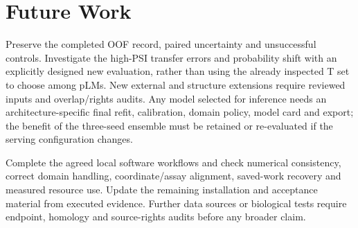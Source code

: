 \section{Future Work}
Preserve the completed OOF record, paired uncertainty and unsuccessful controls. Investigate the
high-PSI transfer errors and probability shift with an explicitly designed new evaluation, rather than
using the already inspected T set to choose among pLMs. New external and structure extensions require
reviewed inputs and overlap/rights audits. Any model selected for inference needs an architecture-specific
final refit, calibration, domain policy, model card and export; the benefit of the three-seed ensemble
must be retained or re-evaluated if the serving configuration changes.

Complete the agreed local software workflows and check numerical consistency, correct domain
handling, coordinate/assay alignment, saved-work recovery and measured resource use. Update the
remaining installation and acceptance material from executed evidence. Further data sources or
biological tests require endpoint, homology and source-rights audits before any broader claim.
